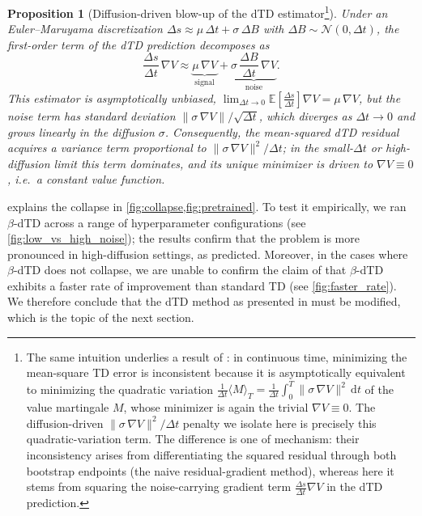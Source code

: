 \documentclass{article}
\newtheorem{proposition}{Proposition}
\begin{document}
\begin{proposition}[Diffusion-driven blow-up of the dTD estimator\footnote{The same intuition underlies a result of \citet{jiazhou2022}: in continuous time, minimizing the mean-square TD error is inconsistent because it is asymptotically equivalent to minimizing the quadratic variation $\tfrac{1}{\Delta t}\langle M \rangle_T = \tfrac{1}{\Delta t}\int_0^T \|\sigma\,\nabla V\|^2\,\mathrm{d}t$ of the value martingale $M$, whose minimizer is again the trivial $\nabla V \equiv 0$. The diffusion-driven $\|\sigma\,\nabla V\|^2/\Delta t$ penalty we isolate here is precisely this quadratic-variation term. The difference is one of mechanism: their inconsistency arises from differentiating the squared residual through both bootstrap endpoints (the naive residual-gradient method), whereas here it stems from squaring the noise-carrying gradient term $\tfrac{\Delta s}{\Delta t}\nabla V$ in the dTD prediction.}]
\label{prop:noise}
Under an Euler--Maruyama discretization $\Delta s \approx \mu\,\Delta t + \sigma\,\Delta B$ with $\Delta B \sim \mathcal{N}(0, \Delta t)$, the first-order term of the dTD prediction decomposes as
\begin{equation}
    \label{eq:noise}
    \frac{\Delta s}{\Delta t}\,\nabla V \approx \underbrace{\mu\,\nabla V}_{\text{signal}} + \underbrace{\sigma\,\frac{\Delta B}{\Delta t}\,\nabla V}_{\text{noise}}.
\end{equation}
This estimator is asymptotically unbiased, $\lim_{\Delta t \to 0} \mathbb{E}\!\left[\tfrac{\Delta s}{\Delta t}\right]\nabla V = \mu\,\nabla V$, but the noise term has standard deviation $\|\sigma\,\nabla V\|/\sqrt{\Delta t}$, which diverges as $\Delta t \to 0$ and grows linearly in the diffusion $\sigma$. Consequently, the mean-squared dTD residual acquires a variance term proportional to $\|\sigma\,\nabla V\|^2/\Delta t$; in the small-$\Delta t$ or high-diffusion limit this term dominates, and its unique minimizer is driven to $\nabla V \equiv 0$, i.e.\ a constant value function.
\end{proposition}

 explains the collapse in \cref{fig:collapse,fig:pretrained}. To test it empirically, we ran $\beta$-dTD across a range of hyperparameter configurations (see \cref{fig:low_vs_high_noise}); the results confirm that the problem is more pronounced in high-diffusion settings, as predicted. Moreover, in the cases where $\beta$-dTD does not collapse, we are unable to confirm the claim of \citet{settai2025} that $\beta$-dTD exhibits a faster rate of improvement than standard TD (see \cref{fig:faster_rate}). We therefore conclude that the dTD method as presented in \citet{settai2025} must be modified, which is the topic of the next section.
\end{document}
